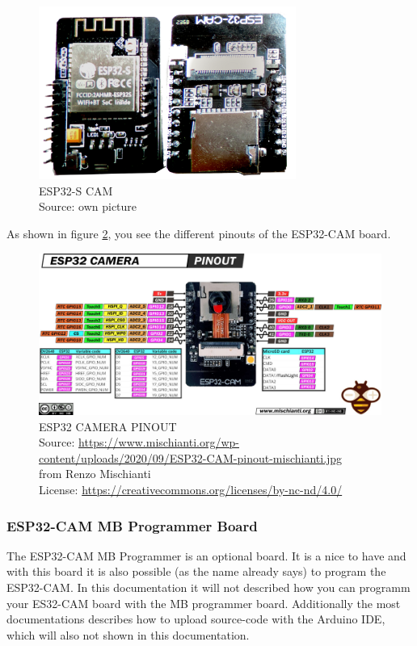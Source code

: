 \begin{figure}[H]
\centering
\includegraphics[width=0.75\textwidth]{esp32-s_overview}
\caption[ESP32-S-CAM]{ESP32-S CAM \\ Source: own picture}
\label{ESP32-S-CAM-overview}
\end{figure}

As shown in figure \ref{ESP32-CAM-pinout}, you see the different pinouts of the ESP32-CAM board.

\begin{figure}[H]
\centering
\includegraphics[width=\textwidth]{ESP32-CAM-pinout-mischianti}
\caption[ESP32 CAMERA PINOUT]{ESP32 CAMERA PINOUT \\ Source: \url{https://www.mischianti.org/wp-content/uploads/2020/09/ESP32-CAM-pinout-mischianti.jpg}\\ from Renzo Mischianti \\ License: \url{https://creativecommons.org/licenses/by-nc-nd/4.0/}}
\label{ESP32-CAM-pinout}
\end{figure}

\subsubsection{ESP32-CAM MB Programmer Board}
The ESP32-CAM MB Programmer is an optional board. It is a nice to have and with this board it is also possible (as the name already says) to program the ESP32-CAM. In this documentation it will not described how you can programm your ES32-CAM board with the MB programmer board. Additionally the most documentations describes how to upload source-code with the Arduino IDE, which will also not shown in this documentation.

